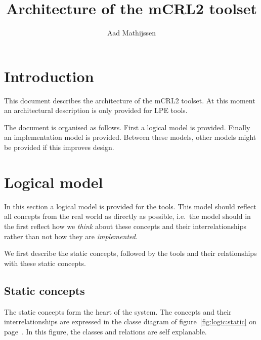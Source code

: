 \documentclass[a4paper,fleqn]{article}
\title{Architecture of the mCRL2 toolset}
\author{Aad Mathijssen}
\begin{document}
\maketitle

\section{Introduction}

This document describes the architecture of the mCRL2 toolset. At this
moment an architectural description is only provided for LPE tools.

The document is organised as follows. First a logical model is provided.
Finally an implementation model is provided. Between these models, other models
might be provided if this improves design.

\section{Logical model}

In this section a logical model is provided for the tools. This model should
reflect all concepts from the real world as directly as possible, i.e.\ the
model should in the first reflect how we \emph{think} about these concepts and their
interrelationships rather than not how they are \emph{implemented}.

We first describe the static concepts, followed by the tools and their
relationships with these static concepts.

\subsection{Static concepts}

The static concepts form the heart of the system. The concepts and their
interrelationships are expressed in the classe diagram of
figure~\ref{fig:logic:static} on page~\pageref{fig:logic:static}. In this
figure, the classes and relations are self explanable.
\end{document}
